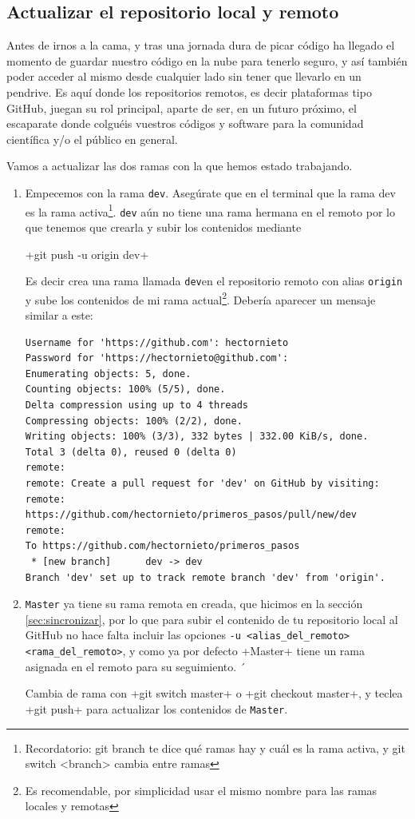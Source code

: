 \documentclass[a5paper, oneside,10pt]{article}
\begin{document}
   \subsection{Actualizar el repositorio  local y remoto}
    Antes de irnos a la cama, y tras una jornada dura de picar código ha llegado el momento de guardar nuestro código en la nube para tenerlo seguro, y así también poder acceder al mismo desde cualquier lado sin tener que llevarlo en un pendrive. Es aquí donde los repositorios remotos, es decir plataformas tipo GitHub, juegan su rol principal, aparte de ser, en un futuro próximo, el escaparate donde colguéis vuestros códigos y software para la comunidad científica y/o el público en general.
    
    Vamos a actualizar las dos ramas con la que hemos estado trabajando. 
    \begin{enumerate}
    
     \item Empecemos con la rama \verb+dev+. Asegúrate que en el terminal que la rama dev es la rama activa\footnote{Recordatorio: git branch te dice qué ramas hay y cuál es la rama activa, y git switch <branch>  cambia entre ramas}. \verb+dev+ aún no tiene una rama hermana en el remoto por lo que tenemos que crearla y subir los contenidos mediante
     
     \cverb+git push -u origin dev+
     
     Es decir crea una rama llamada \verb+dev+en el repositorio remoto con alias \verb+origin+ y sube los contenidos de mi rama actual\footnote{Es recomendable, por simplicidad usar el mismo nombre para las ramas locales y remotas}. Debería aparecer un mensaje similar a este:
     \begin{lstlisting}[style=custom]
Username for 'https://github.com': hectornieto
Password for 'https://hectornieto@github.com': 
Enumerating objects: 5, done.
Counting objects: 100% (5/5), done.
Delta compression using up to 4 threads
Compressing objects: 100% (2/2), done.
Writing objects: 100% (3/3), 332 bytes | 332.00 KiB/s, done.
Total 3 (delta 0), reused 0 (delta 0)
remote: 
remote: Create a pull request for 'dev' on GitHub by visiting:
remote:      https://github.com/hectornieto/primeros_pasos/pull/new/dev
remote: 
To https://github.com/hectornieto/primeros_pasos
 * [new branch]      dev -> dev
Branch 'dev' set up to track remote branch 'dev' from 'origin'.
     \end{lstlisting}

     
     \item \verb+Master+ ya tiene su rama remota en creada, que hicimos en la sección \ref{sec:sincronizar}, por lo que para subir el contenido de tu repositorio local al GitHub no hace falta incluir las opciones \verb+-u <alias_del_remoto> <rama_del_remoto>+, y como ya por defecto +Master+ tiene un rama asignada en el remoto para su seguimiento. ´
     
     Cambia de rama con \cverb+git switch master+ o \cverb+git checkout master+, y teclea \cverb+git push+ para actualizar los contenidos de \verb+Master+.
     
    \end{enumerate}
      
\end{document}
